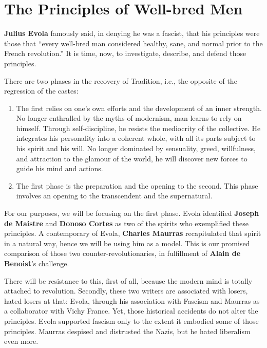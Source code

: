 \section{The Principles of Well-bred Men}

\textbf{Julius Evola} famously said, in denying he was a fascist, that his principles were those that ``every well-bred man considered healthy, sane, and normal prior to the French revolution.'' It is time, now, to investigate, describe, and defend those principles.

There are two phases in the recovery of Tradition, i.e., the opposite of the regression of the castes:

\begin{enumerate}


\item The first relies on one's own efforts and the development of an inner strength. No longer enthralled by the myths of modernism, man learns to rely on himself. Through self-discipline, he resists the mediocrity of the collective. He integrates his personality into a coherent whole, with all its parts subject to his spirit and his will. No longer dominated by sensuality, greed, willfulness, and attraction to the glamour of the world, he will discover new forces to guide his mind and actions.

\item The first phase is the preparation and the opening to the second. This phase involves an opening to the transcendent and the supernatural.
\end{enumerate}


For our purposes, we will be focusing on the first phase. Evola identified \textbf{Joseph de Maistre} and \textbf{Donoso Cortes} as two of the spirits who exemplified these principles. A contemporary of Evola, \textbf{Charles Maurras} recapitulated that spirit in a natural way, hence we will be using him as a model. This is our promised comparison of those two counter-revolutionaries, in fulfillment of \textbf{Alain de Benoist}'s challenge.


There will be resistance to this, first of all, because the modern mind is totally attached to revolution. Secondly, these two writers are associated with losers, hated losers at that: Evola, through his association with Fascism and Maurras as a collaborator with Vichy France. Yet, those historical accidents do not alter the principles. Evola supported fascism only to the extent it embodied some of those principles. Maurras despised and distrusted the Nazis, but he hated liberalism even more.

